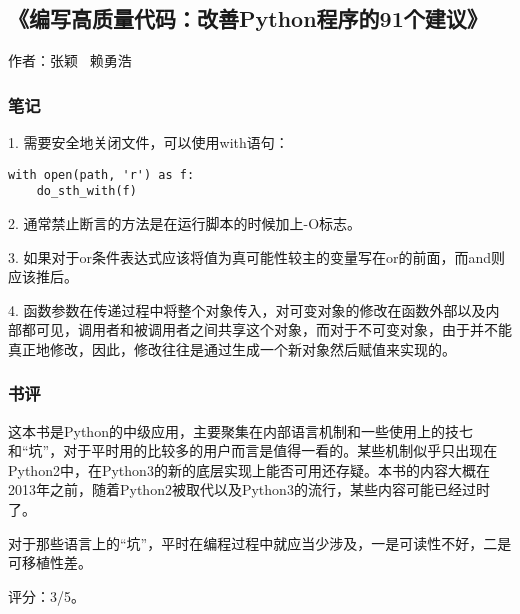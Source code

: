 \subsection{《编写高质量代码：改善Python程序的91个建议》}

作者：张颖 \ 赖勇浩

\subsubsection{笔记}
1. 需要安全地关闭文件，可以使用with语句：
\lstset{
language=Python,
keywordstyle=\bfseries,
stringstyle=\ttfamily,
numbers=left,
numberstyle=\small,
stepnumber=1
}
\begin{lstlisting}
with open(path, 'r') as f:
	do_sth_with(f)
\end{lstlisting}

2. 通常禁止断言的方法是在运行脚本的时候加上-O标志。

3. 如果对于or条件表达式应该将值为真可能性较主的变量写在or的前面，而and则应该推后。

4. 函数参数在传递过程中将整个对象传入，对可变对象的修改在函数外部以及内部都可见，调用者和被调用者之间共享这个对象，而对于不可变对象，由于并不能真正地修改，因此，修改往往是通过生成一个新对象然后赋值来实现的。

\subsubsection{书评}
这本书是Python的中级应用，主要聚集在内部语言机制和一些使用上的技七和“坑”，对于平时用的比较多的用户而言是值得一看的。某些机制似乎只出现在Python2中，在Python3的新的底层实现上能否可用还存疑。本书的内容大概在2013年之前，随着Python2被取代以及Python3的流行，某些内容可能已经过时了。

对于那些语言上的“坑”，平时在编程过程中就应当少涉及，一是可读性不好，二是可移植性差。

评分：3/5。
